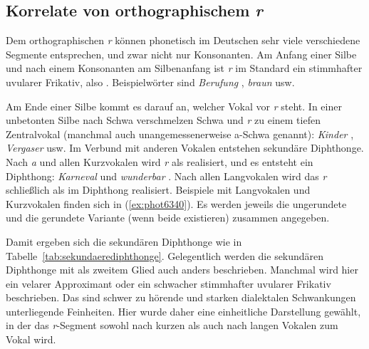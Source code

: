 \subsection{Korrelate von orthographischem \textit{r}}

\label{sec:realisr}

Dem orthographischen \textit{r} können phonetisch im Deutschen sehr viele verschiedene Segmente entsprechen, und zwar nicht nur Konsonanten.
Am Anfang einer Silbe und nach einem Konsonanten am Silbenanfang ist \textit{r} im Standard ein stimmhafter uvularer Frikativ, also \textipa{[K]}.
Beispielwörter sind \textit{Berufung} \textipa{[b@Ku:fUN]}, \textit{braun} \textipa{[bK\t{aO}n]} usw.

Am Ende einer Silbe kommt es darauf an, welcher Vokal vor \textit{r} steht.
In einer unbetonten Silbe nach Schwa verschmelzen Schwa und \textit{r} zu einem tiefen Zentralvokal \textipa{[5]} (manchmal auch unangemessenerweise a-Schwa genannt): \textit{Kinder} \textipa{[kInd5]}, \textit{Vergaser} \textipa{[f5ga:z5]} usw.
Im Verbund mit anderen Vokalen entstehen sekundäre Diphthonge.
Nach \textit{a} und allen Kurzvokalen wird \textit{r} als \textipa{[@]} realisiert, und es entsteht ein Diphthong: \textit{Karneval} \textipa{[k\t{a@}n@val]} und \textit{wunderbar} \textipa{[vUnd5b\t{a@}]}.
Nach allen Langvokalen wird das \textit{r} schließlich als \textipa{[5]} im Diphthong realisiert.
Beispiele mit Langvokalen und Kurzvokalen finden sich in (\ref{ex:phot6340}).
Es werden jeweils die ungerundete und die gerundete Variante (wenn beide existieren) zusammen angegeben.

\enlargethispage{1\baselineskip}
\begin{exe}
  \ex\label{ex:phot6340}
  \begin{xlist}
  \end{xlist}
\end{exe}

Damit ergeben sich die sekundären Diphthonge wie in Tabelle~\ref{tab:sekundaerediphthonge}.
Gelegentlich werden die sekundären Diphthonge mit \textipa{[@]} als zweitem Glied auch anders beschrieben.
Manchmal wird hier ein velarer Approximant \textipa{[\textturnmrleg]} oder ein schwacher stimmhafter uvularer Frikativ \textipa{[\super K]} beschrieben.
Das sind schwer zu hörende und starken dialektalen Schwankungen unterliegende Feinheiten.
Hier wurde daher eine einheitliche Darstellung gewählt, in der das \textit{r}-Segment sowohl nach kurzen als auch nach langen Vokalen zum Vokal wird.

